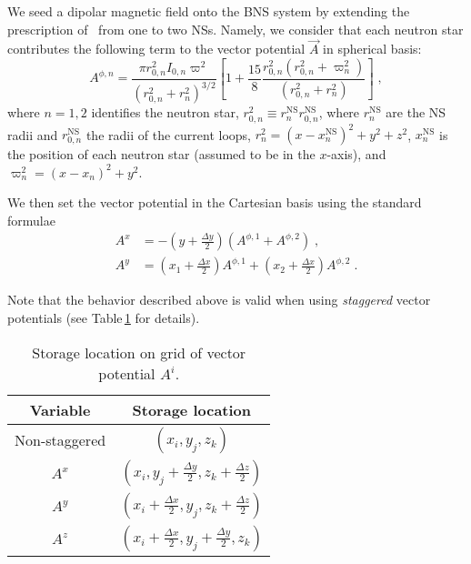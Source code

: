 We seed a dipolar magnetic field onto the BNS system by extending the
prescription of~\cite{paschalidis2013general} from one to two
NSs. Namely, we consider that each neutron star contributes the
following term to the vector potential $\vec{A}$ in spherical basis:
\begin{equation}
  A^{\phi,n} = \frac{\pi r_{0,n}^{2}I_{0,n}\varpi^{2}}{\left(r_{0,n}^{2} + r_{n}^{2}\right)^{3/2}}
             \left[1 + \frac{15}{8}\frac{r_{0,n}^{2}\left(r_{0,n}^{2} + \varpi_{n}^{2}\right)}{\left(r_{0,n}^{2}+r_{n}^{2}\right)}\right]\;,
\end{equation}
where $n=1,2$ identifies the neutron star, $r_{0,n}^{2} \equiv r^{\mathrm{NS}}_{n}r^{\mathrm{NS}}_{0,n}$,
where $r^{\mathrm{NS}}_{n}$ are the NS radii and $r^{\mathrm{NS}}_{0,n}$
the radii of the current loops, $r_{n}^{2} = \left(x-x^{\mathrm{NS}}_{n}\right)^{2}+y^{2}+z^{2}$,
$x^{\mathrm{NS}}_{n}$ is the position of each neutron star (assumed to be in the $x$-axis),
and $\varpi_{n}^{2} = \left(x-x_{n}\right)^{2}+y^{2}$.

We then set the vector potential in the Cartesian basis using the
standard formulae
\begin{align}
  A^{x} &= -\left(y+\frac{\Delta y}{2}\right)\left(A^{\phi,1} + A^{\phi,2}\right)\;,\\
  A^{y} &= \left(x_{1}+\frac{\Delta x}{2}\right)A^{\phi,1} + \left(x_{2}+\frac{\Delta x}{2}\right)A^{\phi,2}\;.
\end{align}

Note that the behavior described above is valid when using
\emph{staggered} vector potentials (see Table\,\ref{tab:A_staggering} for details).

\begin{table}
  \centering
  \begin{tabular}{c c}
    \hline
    \hline
    Variable & Storage location\\
    \hline
    Non-staggered & $\left(x_{i},y_{j},z_{k}\right)$\\
    $A^{x}$        & $\left(x_{i},y_{j}+\frac{\Delta y}{2},z_{k}+\frac{\Delta z}{2}\right)$\\
    $A^{y}$        & $\left(x_{i}+\frac{\Delta x}{2},y_{j},z_{k}+\frac{\Delta z}{2}\right)$\\
    $A^{z}$        & $\left(x_{i}+\frac{\Delta x}{2},y_{j}+\frac{\Delta y}{2},z_{k}\right)$\\
    \hline
    \hline
  \end{tabular}
  \caption{Storage location on grid of vector potential $A^{i}$.}
  \label{tab:A_staggering}
\end{table}


